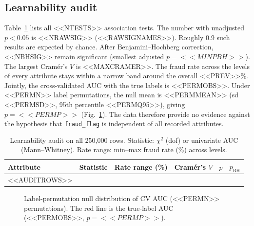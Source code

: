 \documentclass[conference]{IEEEtran}
\begin{document}
\subsection{Learnability audit}\label{sec:audit}
Table~\ref{tab:audit} lists all <<NTESTS>> association tests. The number with unadjusted $p<0.05$ is <<NRAWSIG>> (<<RAWSIGNAMES>>). Roughly 0.9 such results are expected by chance. After Benjamini--Hochberg correction, <<NBHSIG>> remain significant (smallest adjusted $p=<<MINPBH>>$). The largest Cram\'er's $V$ is <<MAXCRAMER>>. The fraud rate across the levels of every attribute stays within a narrow band around the overall <<PREV>>\%. Jointly, the cross-validated AUC with the true labels is <<PERMOBS>>. Under <<PERMN>> label permutations, the null mean is <<PERMMEAN>> (sd <<PERMSD>>, 95th percentile <<PERMQ95>>), giving $p=<<PERMP>>$ (Fig.~\ref{fig:perm}). The data therefore provide no evidence against the hypothesis that \texttt{fraud\_flag} is independent of all recorded attributes.

\begin{table}[t]
\centering
\caption{Learnability audit on all 250,000 rows. Statistic: $\chi^2$ (dof) or univariate AUC (Mann--Whitney). Rate range: min--max fraud rate (\%) across levels.}\label{tab:audit}
\footnotesize
\begin{tabular}{@{}lccccc@{}}
\toprule
Attribute & Statistic & Rate range (\%) & Cram\'er's $V$ & $p$ & $p_{\text{BH}}$ \\
\midrule
<<AUDITROWS>>
\bottomrule
\end{tabular}
\end{table}

\begin{figure}[t]
\centering
{}
\caption{Label-permutation null distribution of CV AUC (<<PERMN>> permutations). The red line is the true-label AUC (<<PERMOBS>>, $p=<<PERMP>>$).}\label{fig:perm}
\end{figure}
\end{document}
